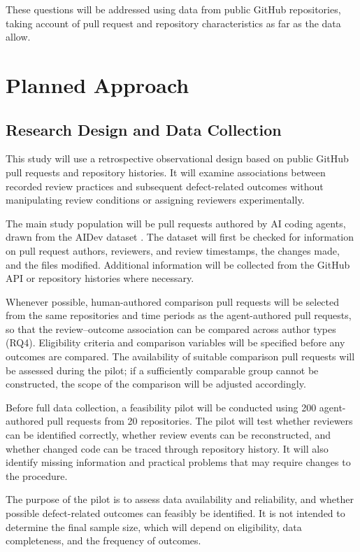 \documentclass[stu,12pt,donotrepeattitle]{apa7}
\begin{document}
These questions will be addressed using data from public GitHub repositories, taking account of pull request and repository characteristics as far as the data allow.

\section{Planned Approach}

\subsection{Research Design and Data Collection}

This study will use a retrospective observational design based on public GitHub pull requests and repository histories. It will examine associations between recorded review practices and subsequent defect-related outcomes without manipulating review conditions or assigning reviewers experimentally.

The main study population will be pull requests authored by AI coding agents, drawn from the AIDev dataset \parencite{li2025}. The dataset will first be checked for information on pull request authors, reviewers, and review timestamps, the changes made, and the files modified. Additional information will be collected from the GitHub API or repository histories where necessary.

Whenever possible, human-authored comparison pull requests will be selected from the same repositories and time periods as the agent-authored pull requests, so that the review--outcome association can be compared across author types (RQ4). Eligibility criteria and comparison variables will be specified before any outcomes are compared. The availability of suitable comparison pull requests will be assessed during the pilot; if a sufficiently comparable group cannot be constructed, the scope of the comparison will be adjusted accordingly.

Before full data collection, a feasibility pilot will be conducted using 200 agent-authored pull requests from 20 repositories. The pilot will test whether reviewers can be identified correctly, whether review events can be reconstructed, and whether changed code can be traced through repository history. It will also identify missing information and practical problems that may require changes to the procedure.

The purpose of the pilot is to assess data availability and reliability, and whether possible defect-related outcomes can feasibly be identified. It is not intended to determine the final sample size, which will depend on eligibility, data completeness, and the frequency of outcomes.
\end{document}
